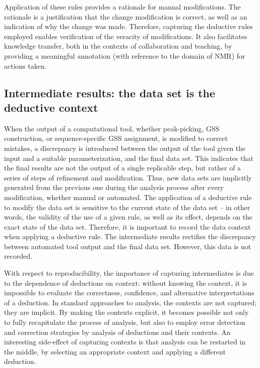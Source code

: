Application of these rules provides a rationale for manual modifications.  The
rationale is a justification that the change modification is correct, as
well as an indication of why the change was made.  Therefore, capturing the
deductive rules employed enables verification of the veracity of modifications. 
It also facilitates knowledge transfer, both in the contexts of collaboration
and teaching, by providing a meaningful annotation (with reference to the
domain of NMR) for actions taken.


\subsection*{Intermediate results: the data set is the deductive context}
When the output of a computational tool, whether peak-picking, GSS construction, 
or sequence-specific GSS assignment, is modified to correct mistakes,
a discrepancy is introduced between the output of the tool 
given the input and a suitable parameterization, and the final data set. 
This indicates that the final results are not the output of a single 
replicable step, but rather of a series of steps of refinement and 
modification.  Thus, new data sets are implicitly generated from the previous
one during the analysis process after every modification, whether manual or automated.
The application of a deductive rule to modify the data set is sensitive to
the current state of the data set -- in other words, the validity of the 
use of a given rule, as well as its effect, depends on the exact state of
the data set.  Therefore, it is important to record the data context when
applying a deductive rule.  The intermediate results rectifies the discrepancy 
between automated tool output and the final data set.  However, this data is 
not recorded.

With respect to reproducibility, the importance of capturing intermediates is 
due to the dependence of deductions on context: without knowing the context, 
it is impossible to evaluate the correctness, confidence, and alternative 
interpretations of a deduction.  In standard approaches to analysis, the 
contexts are not captured; they are implicit.  By making the contexts 
explicit, it becomes possible not only to fully recapitulate the process of 
analysis, but also to employ error detection and correction strategies by 
analysis of deductions and their contexts.  An interesting side-effect of 
capturing contexts is that analysis can be restarted in the middle, by 
selecting an appropriate context and applying a different deduction.

